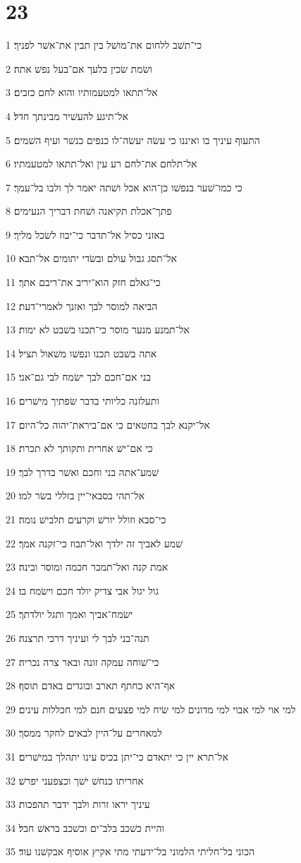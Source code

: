 \chapter{23}

\par 1 כי־תשׁב ללחום את־מושׁל בין תבין את־אשׁר לפניך׃
\par 2 ושׂמת שׂכין בלעך אם־בעל נפשׁ אתה׃
\par 3 אל־תתאו למטעמותיו והוא לחם כזבים׃
\par 4 אל־תיגע להעשׁיר מבינתך חדל׃
\par 5 התעוף עיניך בו ואיננו כי עשׂה יעשׂה־לו כנפים כנשׁר ועיף השׁמים׃
\par 6 אל־תלחם את־לחם רע עין ואל־תתאו למטעמתיו׃
\par 7 כי כמו־שׁער בנפשׁו כן־הוא אכל ושׁתה יאמר לך ולבו בל־עמך׃
\par 8 פתך־אכלת תקיאנה ושׁחת דבריך הנעימים׃
\par 9 באזני כסיל אל־תדבר כי־יבוז לשׂכל מליך׃
\par 10 אל־תסג גבול עולם ובשׂדי יתומים אל־תבא׃
\par 11 כי־גאלם חזק הוא־יריב את־ריבם אתך׃
\par 12 הביאה למוסר לבך ואזנך לאמרי־דעת׃
\par 13 אל־תמנע מנער מוסר כי־תכנו בשׁבט לא ימות׃
\par 14 אתה בשׁבט תכנו ונפשׁו משׁאול תציל׃
\par 15 בני אם־חכם לבך ישׂמח לבי גם־אני׃
\par 16 ותעלזנה כליותי בדבר שׂפתיך מישׁרים׃
\par 17 אל־יקנא לבך בחטאים כי אם־ביראת־יהוה כל־היום׃
\par 18 כי אם־ישׁ אחרית ותקותך לא תכרת׃
\par 19 שׁמע־אתה בני וחכם ואשׁר בדרך לבך׃
\par 20 אל־תהי בסבאי־יין בזללי בשׂר למו׃
\par 21 כי־סבא וזולל יורשׁ וקרעים תלבישׁ נומה׃
\par 22 שׁמע לאביך זה ילדך ואל־תבוז כי־זקנה אמך׃
\par 23 אמת קנה ואל־תמכר חכמה ומוסר ובינה׃
\par 24 גול יגול אבי צדיק יולד חכם וישׂמח בו׃
\par 25 ישׂמח־אביך ואמך ותגל יולדתך׃
\par 26 תנה־בני לבך לי ועיניך דרכי תרצנה׃
\par 27 כי־שׁוחה עמקה זונה ובאר צרה נכריה׃
\par 28 אף־היא כחתף תארב ובוגדים באדם תוסף׃
\par 29 למי אוי למי אבוי למי מדונים למי שׂיח למי פצעים חנם למי חכללות עינים׃
\par 30 למאחרים על־היין לבאים לחקר ממסך׃
\par 31 אל־תרא יין כי יתאדם כי־יתן בכיס עינו יתהלך במישׁרים׃
\par 32 אחריתו כנחשׁ ישׁך וכצפעני יפרשׁ׃
\par 33 עיניך יראו זרות ולבך ידבר תהפכות׃
\par 34 והיית כשׁכב בלב־ים וכשׁכב בראשׁ חבל׃
\par 35 הכוני בל־חליתי הלמוני בל־ידעתי מתי אקיץ אוסיף אבקשׁנו עוד׃

